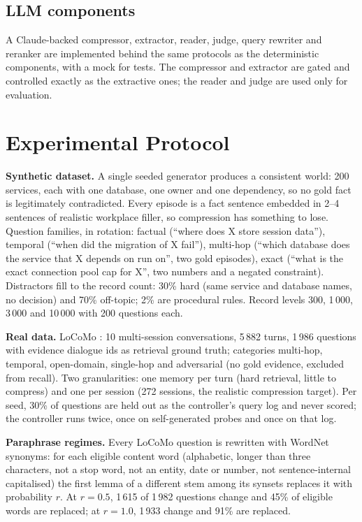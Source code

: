 \documentclass[journal]{IEEEtran}
\begin{document}
\subsection{LLM components}
A Claude-backed compressor, extractor, reader, judge, query rewriter and reranker are implemented behind the same protocols as the deterministic components, with a mock for tests. The compressor and extractor are gated and controlled exactly as the extractive ones; the reader and judge are used only for evaluation.

\section{Experimental Protocol}
\textbf{Synthetic dataset.} A single seeded generator produces a consistent world: 200 services, each with one database, one owner and one dependency, so no gold fact is legitimately contradicted. Every episode is a fact sentence embedded in 2--4 sentences of realistic workplace filler, so compression has something to lose. Question families, in rotation: factual (``where does X store session data''), temporal (``when did the migration of X fail''), multi-hop (``which database does the service that X depends on run on'', two gold episodes), exact (``what is the exact connection pool cap for X'', two numbers and a negated constraint). Distractors fill to the record count: 30\% hard (same service and database names, no decision) and 70\% off-topic; 2\% are procedural rules. Record levels 300, 1\,000, 3\,000 and 10\,000 with 200 questions each.

\textbf{Real data.} LoCoMo \cite{locomo}: 10 multi-session conversations, 5\,882 turns, 1\,986 questions with evidence dialogue ids as retrieval ground truth; categories multi-hop, temporal, open-domain, single-hop and adversarial (no gold evidence, excluded from recall). Two granularities: one memory per turn (hard retrieval, little to compress) and one per session (272 sessions, the realistic compression target). Per seed, 30\% of questions are held out as the controller's query log and never scored; the controller runs twice, once on self-generated probes and once on that log.

\textbf{Paraphrase regimes.} Every LoCoMo question is rewritten with WordNet synonyms: for each eligible content word (alphabetic, longer than three characters, not a stop word, not an entity, date or number, not sentence-internal capitalised) the first lemma of a different stem among its synsets replaces it with probability $r$. At $r = 0.5$, 1\,615 of 1\,982 questions change and 45\% of eligible words are replaced; at $r = 1.0$, 1\,933 change and 91\% are replaced.
\end{document}
